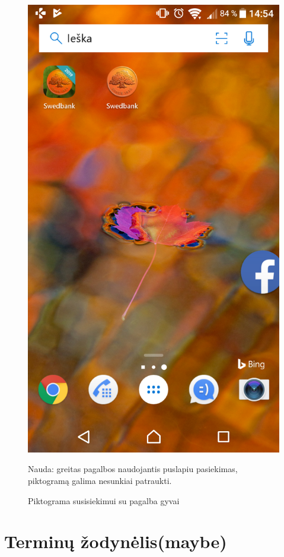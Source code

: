 \documentclass{VUMIFPSkursinis}
\begin{document}
\begin{figure}[!htb]
	\begin{center}
	\includegraphics[scale=0.2]{pagalbaGyvai.png}
	\end{center}
  \caption{Piktograma susisiekimui su pagalba gyvai}
	\label{fig:pagalbaGyvai}
	Nauda: greitas pagalbos naudojantis puslapiu pasiekimas, piktogramą galima nesunkiai patraukti.
\end{figure}
\section{Terminų žodynėlis(maybe)}
\end{document}
